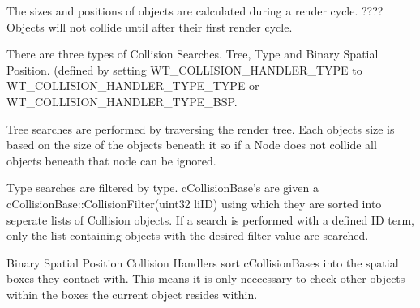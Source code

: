 The sizes and positions of objects are calculated during a render cycle. ????Objects will not collide until after their first render cycle.

There are three types of Collision Searches. Tree, Type and Binary Spatial Position. (defined by setting WT\_\-COLLISION\_\-HANDLER\_\-TYPE to WT\_\-COLLISION\_\-HANDLER\_\-TYPE\_\-TYPE or WT\_\-COLLISION\_\-HANDLER\_\-TYPE\_\-BSP.

Tree searches are performed by traversing the render tree. Each objects size is based on the size of the objects beneath it so if a Node does not collide all objects beneath that node can be ignored.

Type searches are filtered by type. cCollisionBase's are given a cCollisionBase::CollisionFilter(uint32 liID) using which they are sorted into seperate lists of Collision objects. If a search is performed with a defined ID term, only the list containing objects with the desired filter value are searched.

Binary Spatial Position Collision Handlers sort cCollisionBases into the spatial boxes they contact with. This means it is only neccessary to check other objects within the boxes the current object resides within. 